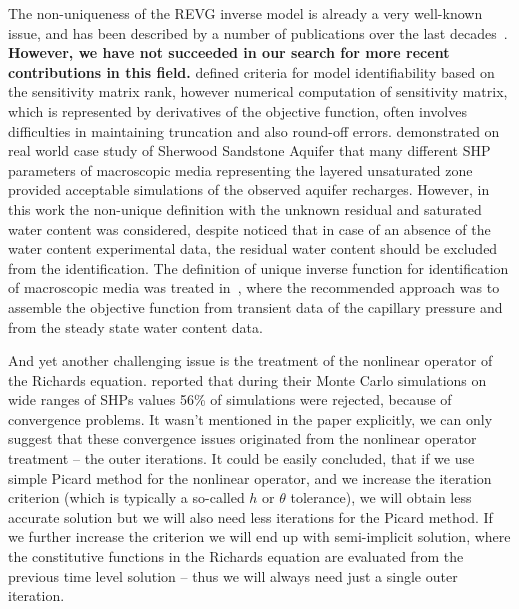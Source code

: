 \documentclass[review]{elsarticle}
\begin{document}
The non-uniqueness of the REVG inverse model is already a very well-known issue, and has been described by a number of publications over the last decades~\citep{kool1985, mous1993, ihlwang2003, beven2003-uncertain}. \textbf{However, we have not succeeded in our search for more recent contributions in this field.} \cite{mous1993} defined criteria for model identifiability based on the sensitivity matrix rank, however numerical computation of sensitivity matrix, which is represented by derivatives of the objective function,  often involves difficulties in maintaining truncation and also round-off errors.
\cite{beven2003-uncertain} demonstrated on real world case study of Sherwood Sandstone Aquifer that many different SHP parameters of macroscopic media representing the layered  unsaturated zone provided acceptable simulations of the observed aquifer recharges. However, in this work 
the non-unique definition with the unknown residual and saturated water content was considered, despite \cite{mous1993} noticed that  in case of an absence of the water content experimental data, the residual water content should be excluded from the identification.
The definition of unique inverse function for identification of macroscopic media was treated in~\citep{zou200126}, where the recommended approach was to assemble the objective function from transient data of the capillary pressure and from the steady state water content data. %

And yet another challenging issue is the treatment of the nonlinear operator of the Richards equation. \cite{beven2003-uncertain} reported that during their Monte Carlo simulations on wide ranges of SHPs values 56\% of simulations were rejected, because of convergence problems. 
It wasn't mentioned in the paper explicitly, we can only suggest that these convergence issues originated from the nonlinear operator treatment -- the outer iterations.
It could be easily concluded, that if we use simple Picard method for the nonlinear operator, and we increase the iteration criterion (which is typically a so-called $h$ or $\theta$ tolerance), we will obtain less accurate solution but we will also need less iterations for the Picard method. If we further increase the criterion we will end up with semi-implicit solution, where the constitutive functions in the Richards equation are evaluated from the previous time level solution -- thus we will always need just a single outer iteration.
\end{document}
